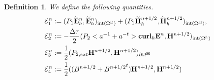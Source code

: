 \documentclass[12pt,reqno]{amsart}
\newcommand{\curl}{{\bf curl}}
\newcommand{\e}{{\bf E}}
\newcommand{\h}{{\bf H}}
\newtheorem{defi}[theorem]{Definition}
\theoremstyle{definition}
\numberwithin{equation}{section}
\newcommand{\intr}[1]{\mathrm{int}(#1)}
\def\Gw{\Omega}     \def\Gx{\Xi}         \def\Gy{\Psi}
\begin{document}
\begin{defi}
	We define the following quantities.
	\begin{align*}
	&
	\mathcal{E}_1^{n}:=
	(P_1\widetilde{\e}_h^{n},\widetilde{\e}_h^{n})_{\intr{\Gw^\e}}+
	(P_1\widetilde{\h}_h^{n+1/2},\widetilde{\h}_h^{n+1/2})_{\intr{\Gw^\h}}, \\&
	\mathcal{E}_2^{n}:=-\frac{\Delta \tau}{2}(P_2<a^{-1}+a^{-t}>\curl_h \e^{n},\h^{n+1/2})_{\intr{\Gw^{h}}}\\&
		\mathcal{E}_3^{n}:=\frac{1}{2}(P_{2,ext}\h^{n+1/2},\h^{n+1/2})_{\partial \Gw^\h}\\&
	\mathcal{E}_4^{n}:=\frac{1}{2}((B^{n+1/2}+{B^{n+1/2}}^t)\h^{n+1/2},\h^{n+1/2})
\end{align*}
\end{defi}
\end{document}
